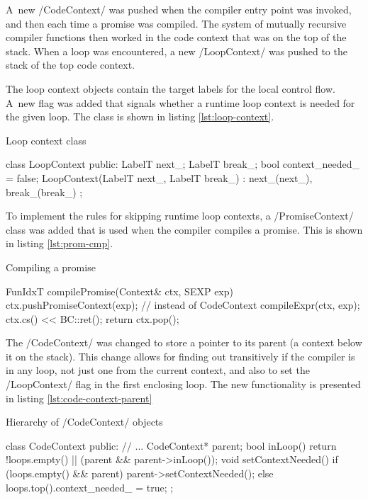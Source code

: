 A~new \cppinline/CodeContext/ was pushed when the compiler entry point was invoked, and then each time a promise was compiled. The system of mutually recursive compiler functions then worked in the code context that was on the top of the stack. When a loop was encountered, a new \cppinline/LoopContext/ was pushed to the stack of the top code context.

The loop context objects contain the target labels for the local control flow. A~new flag was added that signals whether a runtime loop context is needed for the given loop. The class is shown in listing \ref{lst:loop-context}.

\begin{listing}[htbp]
  \caption{\label{lst:loop-context}Loop context class}
  \begin{cppcode}
class LoopContext {
  public:
    LabelT next_;
    LabelT break_;
    bool context_needed_ = false;
    LoopContext(LabelT next_, LabelT break_)
        : next_(next_), break_(break_) {}
};
  \end{cppcode}
\end{listing}

To implement the rules for skipping runtime loop contexts, a \cppinline/PromiseContext/ class was added that is used when the compiler compiles a promise. This is shown in listing \ref{lst:prom-cmp}.

\begin{listing}[htbp]
  \caption{\label{lst:prom-cmp}Compiling a promise}
  \begin{cppcode}
FunIdxT compilePromise(Context& ctx, SEXP exp) {
    ctx.pushPromiseContext(exp);  // instead of CodeContext
    compileExpr(ctx, exp);
    ctx.cs() << BC::ret();
    return ctx.pop();
}
  \end{cppcode}
\end{listing}

The \cppinline/CodeContext/ was changed to store a pointer to its parent (a context below it on the stack). This change allows for finding out transitively if the compiler is in any loop, not just one from the current context, and also to set the \cppinline/LoopContext/ flag in the first enclosing loop. The new functionality is presented in listing \ref{lst:code-context-parent}

\begin{listing}[htbp]
  \caption{\label{lst:code-context-parent}Hierarchy of \cppinline/CodeContext/ objects}
  \begin{cppcode}
class CodeContext {
  public:
    // ...
    CodeContext* parent;
    bool inLoop() {
        return !loops.empty() || (parent && parent->inLoop());
    }
    void setContextNeeded() {
        if (loops.empty() && parent)
            parent->setContextNeeded();
        else
            loops.top().context_needed_ = true;
    }
};
  \end{cppcode}
\end{listing}

